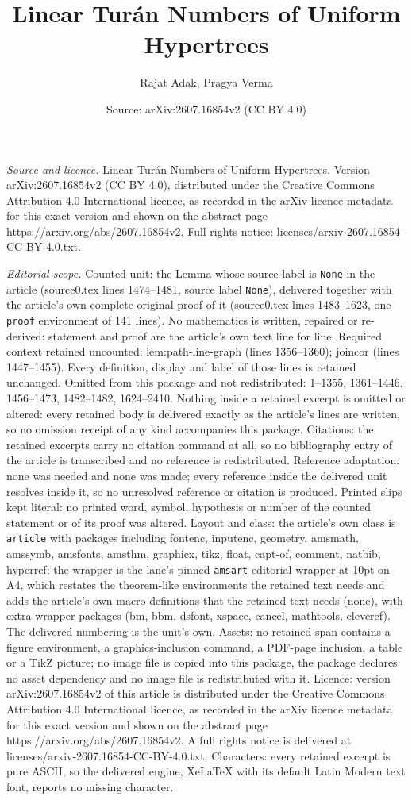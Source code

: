\documentclass[10pt,a4paper]{amsart}
\title[Linear Tur\'an Numbers of Uniform Hypertrees]{Linear Tur\'an Numbers of Uniform Hypertrees}
\author{Rajat Adak, Pragya Verma}
\date{Source: arXiv:2607.16854v2 (CC BY 4.0)}
\begin{document}
\maketitle

\noindent\emph{Source and licence.} Linear Tur\'an Numbers of Uniform Hypertrees. Version arXiv:2607.16854v2 (CC BY 4.0), distributed under the Creative Commons Attribution 4.0 International licence, as recorded in the arXiv licence metadata for this exact version and shown on the abstract page https://arxiv.org/abs/2607.16854v2. Full rights notice: licenses/arxiv-2607.16854-CC-BY-4.0.txt.\par\smallskip

\noindent\textit{Editorial scope.} Counted unit: the Lemma whose source label is \texttt{None} in the article (source0.tex lines 1474--1481, source label \texttt{None}), delivered together with the article's own complete original proof of it (source0.tex lines 1483--1623, one \texttt{proof} environment of 141 lines). No mathematics is written, repaired or re-derived: statement and proof are the article's own text line for line. Required context retained uncounted: lem:path-line-graph (lines 1356--1360); joincor (lines 1447--1455). Every definition, display and label of those lines is retained unchanged. Omitted from this package and not redistributed: 1--1355, 1361--1446, 1456--1473, 1482--1482, 1624--2410. Nothing inside a retained excerpt is omitted or altered: every retained body is delivered exactly as the article's lines are written, so no omission receipt of any kind accompanies this package. Citations: the retained excerpts carry no citation command at all, so no bibliography entry of the article is transcribed and no reference is redistributed. Reference adaptation: none was needed and none was made; every reference inside the delivered unit resolves inside it, so no unresolved reference or citation is produced. Printed slips kept literal: no printed word, symbol, hypothesis or number of the counted statement or of its proof was altered. Layout and class: the article's own class is \texttt{article} with packages including fontenc, inputenc, geometry, amsmath, amssymb, amsfonts, amsthm, graphicx, tikz, float, capt-of, comment, natbib, hyperref; the wrapper is the lane's pinned \texttt{amsart} editorial wrapper at 10pt on A4, which restates the theorem-like environments the retained text needs and adds the article's own macro definitions that the retained text needs (none), with extra wrapper packages (bm, bbm, dsfont, xspace, cancel, mathtools, cleveref). The delivered numbering is the unit's own. Assets: no retained span contains a figure environment, a graphics-inclusion command, a PDF-page inclusion, a table or a TikZ picture; no image file is copied into this package, the package declares no asset dependency and no image file is redistributed with it. Licence: version arXiv:2607.16854v2 of this article is distributed under the Creative Commons Attribution 4.0 International licence, as recorded in the arXiv licence metadata for this exact version and shown on the abstract page https://arxiv.org/abs/2607.16854v2. A full rights notice is delivered at licenses/arxiv-2607.16854-CC-BY-4.0.txt. Characters: every retained excerpt is pure ASCII, so the delivered engine, XeLaTeX with its default Latin Modern text font, reports no missing character.
\end{document}
